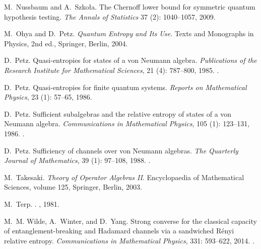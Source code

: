 \documentclass[12pt]{article}
\theoremstyle{definition}
\theoremstyle{remark}
\numberwithin{equation}{section}
\begin{document}
\begin{thebibliography}{27}
M.~Nussbaum and A.~Szko{\l}a.
\newblock The Chernoff lower bound for symmetric quantum hypothesis testing.
\newblock \emph{The Annals of Statistics} 37 (2): 1040--1057, 2009.

M.~Ohya and D.~Petz.
\newblock \emph{Quantum Entropy and Its Use}.
\newblock Texts and Monographs in Physics, 2nd ed., Springer, Berlin, 2004.

D.~Petz.
\newblock Quasi-entropies for states of a von {N}eumann algebra.
\newblock \emph{Publications of the Research Institute for Mathematical
  Sciences}, 21 (4): 787--800, 1985.
\newblock {}.

D.~Petz.
\newblock Quasi-entropies for finite quantum systems.
\newblock \emph{Reports on Mathematical Physics}, 23 (1):
  57--65, 1986{}.

D.~Petz.
\newblock Sufficient subalgebras and the relative entropy of states of a von
  {Neumann} algebra.
\newblock \emph{Communications in Mathematical Physics}, 105
  (1): 123--131, 1986.
\newblock {}.

D.~Petz.
\newblock Sufficiency of channels over von {Neumann} algebras.
\newblock \emph{The Quarterly Journal of Mathematics}, 39
  (1): 97--108, 1988.
\newblock {}.

M.~Takesaki.
\newblock \emph{Theory of Operator Algebras II}.
\newblock Encyclopaedia of Mathematical Sciences, volume 125, Springer, Berlin, 2003.

M.~Terp.
.
, {1981}.

M.~M. Wilde, A.~Winter, and D.~Yang.
\newblock Strong converse for the classical capacity of entanglement-breaking
  and {Hadamard channels via a sandwiched R{\'e}nyi} relative entropy.
\newblock \emph{Communications in Mathematical Physics}, 331:
  593--622, 2014.
\newblock {}.


\end{thebibliography}
\end{document}
